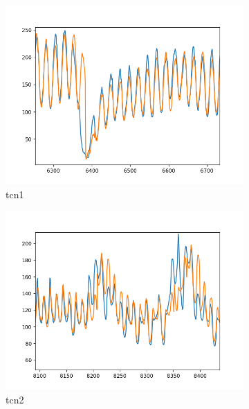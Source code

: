 \begin{figure}
    \centering
    \begin{subfigure}[b]{0.55\textwidth}
        \centering
        \includegraphics[width=\textwidth]{../Figures/tcn-1.png}
        \caption{tcn1}
        \label{fig:tcn1}
    \end{subfigure}
    \hfill
    \begin{subfigure}[b]{0.55\textwidth}
        \centering
        \includegraphics[width=\textwidth]{../Figures/tcn-2.png}
        \caption{tcn2}
        \label{fig:tcn2}
    \end{subfigure}
    \hfill
    \begin{subfigure}[b]{0.55\textwidth}
        \centering

\end{subfigure}
\end{figure}
